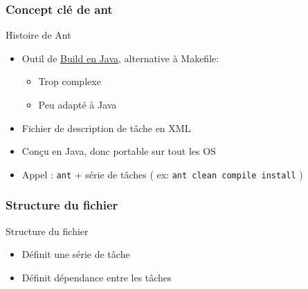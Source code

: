 \documentclass[handout]{beamer}
\begin{document}
\subsubsection{Concept clé de ant}
\begin{frame}
	\begin{block}{Histoire de Ant}
		\begin{itemize}
			\item Outil de \underline{Build en Java}, alternative à Makefile:
				\begin{itemize}
				 	\item Trop complexe
					\item Peu adapté à Java
				\end{itemize}
			\item Fichier de description de tâche en XML
			\item Conçu en Java, donc portable sur tout les OS
			\item Appel : \texttt{ant} + série de tâches ( ex: \texttt{ant clean compile install} )
		\end{itemize}
	 \end{block}
\end{frame}

\subsubsection{Structure du fichier}

\begin{frame}
	\begin{block}{Structure du fichier}
		\begin{itemize}
			\item Définit une série de tâche
			\item Définit dépendance entre les tâches
		\end{itemize}
		
	\end{block}
\end{frame}
\end{document}
